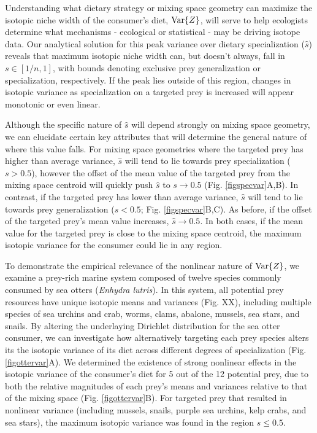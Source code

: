 \documentclass{frontiersSCNS}
\begin{document}
Understanding what dietary strategy or mixing space geometry can maximize the isotopic niche width of the consumer's diet, ${\rm Var}\{Z\}$, will serve to help ecologists determine what mechanisms - ecological or statistical - may be driving isotope data.
Our analytical solution for this peak variance over dietary specialization ($\hat s$) reveals that maximum isotopic niche width can, but doesn't always, fall in $s \in [1/n,1]$, with bounds denoting exclusive prey generalization or specialization, respectively.
If the peak lies outside of this region, changes in isotopic variance as specialization on a targeted prey is increased will appear monotonic or even linear.

Although the specific nature of $\hat s$ will depend strongly on mixing space geometry, we can elucidate certain key attributes that will determine the general nature of where this value falls.
For mixing space geometries where the targeted prey has higher than average variance, $\hat s$ will tend to lie towards prey specialization ($s>0.5$), however the offset of the mean value of the targeted prey from the mixing space centroid will quickly push $\hat s$ to $s \to 0.5$ (Fig. \ref{figspecvar}A,B).
In contrast, if the targeted prey has lower than average variance, $\hat s$ will tend to lie towards prey generalization ($s < 0.5$; Fig. \ref{figspecvar}B,C).
As before, if the offset of the targeted prey's mean value increases, $\hat s \to 0.5$.
In both cases, if the mean value for the targeted prey is close to the mixing space centroid, the maximum isotopic variance for the consumer could lie in any region.

To demonstrate the empirical relevance of the nonlinear nature of ${\rm Var}\{Z\}$, we examine a prey-rich marine system composed of twelve species commonly consumed by sea otters ({\it Enhydra lutris}).
In this system, all potential prey resources have unique isotopic means and variances (Fig. XX), including multiple species of sea urchins and crab, worms, clams, abalone, mussels, sea stars, and snails.
By altering the underlaying Dirichlet distribution for the sea otter consumer, we can investigate how alternatively targeting each prey species alters its the isotopic variance of its diet across different degrees of specialization (Fig. \ref{figottervar}A).
We determined the existence of strong nonlinear effects in the isotopic variance of the consumer's diet for 5 out of the 12 potential prey, due to both the relative magnitudes of each prey's means and variances relative to that of the mixing space (Fig. \ref{figottervar}B).
For targeted prey that resulted in nonlinear variance (including mussels, snails, purple sea urchins, kelp crabs, and sea stars), the maximum isotopic variance was found in the region $s \leq 0.5$.
\end{document}
